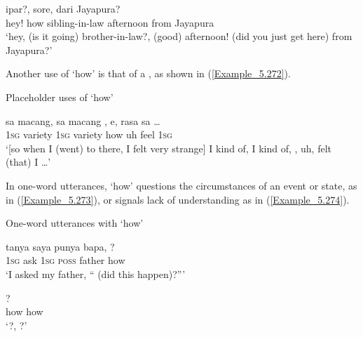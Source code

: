 \ea
\label{Example_5.271}
 {} {ipar?,} {sore,} {dari} {Jayapura?}\\ %
 hey!  how  sibling-in-law  afternoon  from  Jayapura\\
 ‘hey,  (is it going) brother-in-law?, (good) afternoon! (did you just get here) from Jayapura?’ \textstyleExampleSource{[081110-002-Cv.0003]}\\
\z


Another use of  ‘how’ is that of a , as shown in (\ref{Example_5.272}).


\begin{styleExampleTitle}
Placeholder uses of  ‘how’
\end{styleExampleTitle}

\ea
\label{Example_5.272}
\gll {{\ldots}} {sa} {macang,} {sa} {macang} {,} {e,} {rasa} {sa} {{\ldots}}\\ %
 { }  \textsc{1sg}  variety  \textsc{1sg}  variety  how  uh  feel  \textsc{1sg}  \\
\glt 
‘[so when I (went) to  there, I felt very strange] I kind of, I kind of, , uh, felt (that) I {\ldots}’ \textstyleExampleSource{[081011-013-Cv.0009]}
\z


In one-word utterances,  ‘how’ questions the circumstances of an event or state, as in (\ref{Example_5.273}), or signals lack of understanding as in (\ref{Example_5.274}).


\begin{styleExampleTitle}
One-word utterances with  ‘how’
\end{styleExampleTitle}

\ea
\label{Example_5.273}
 {tanya} {saya} {punya} {bapa,} {?}\\ %
 \textsc{1sg}  ask  \textsc{1sg}  \textsc{poss}  father  how\\
\glt 
‘I asked my father, `` (did this happen)?''' \textstyleExampleSource{[080921-011-Cv.0012]}
\z

\ea
\label{Example_5.274}
 {?}\\ %
 how  how\\
 ‘?, ?’ \textstyleExampleSource{[080922-001b-CvPh.0027]}
\z


